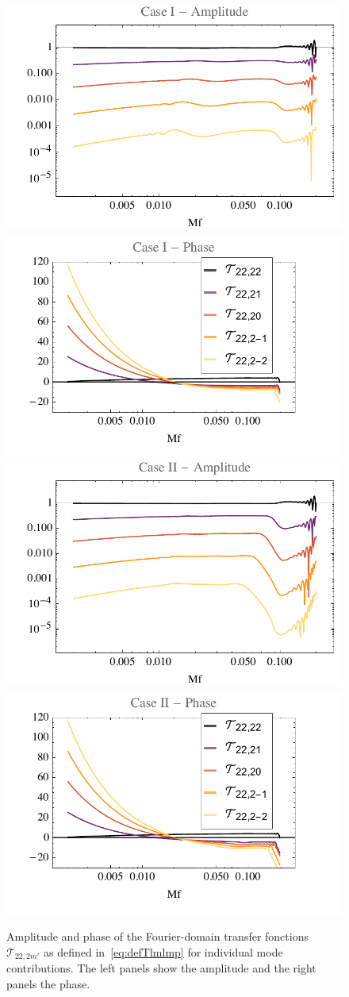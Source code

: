 \documentclass[aps,showpacs,%
prd,superscriptaddress,nofootinbib]{revtex4}
\newcommand\calT{{\mathcal{T}}}
\begin{document}
\begin{figure}
  \centering
  \includegraphics[width=.48\linewidth]{plots/prectransferAcaseI.pdf}
  \hspace{0.2cm}
  \includegraphics[width=.48\linewidth]{plots/prectransferPsicaseI.pdf}
  \includegraphics[width=.48\linewidth]{plots/prectransferAcaseII.pdf}
  \hspace{0.2cm}
  \includegraphics[width=.48\linewidth]{plots/prectransferPsicaseII.pdf}  
  \caption{Amplitude and phase of the Fourier-domain transfer fonctions $\calT_{22,2m'}$ as defined in~\eqref{eq:defTlmlmp} for individual mode contributions. The left panels show the amplitude and the right panels the phase.}
  \label{fig:prectransfer}
\end{figure}

\end{document}
